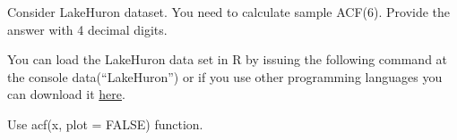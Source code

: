 
\begin{question}
Consider LakeHuron dataset. You need to calculate sample ACF(6). Provide the answer with 4 decimal digits.

You can load the LakeHuron data set in R by issuing the following command at the console data(``LakeHuron'') or if you use other programming languages you can download it \href{https://github.com/vincentarelbundock/Rdatasets/blob/master/csv/datasets/LakeHuron.csv}{here}.
\end{question}

\begin{solution}
Use acf(x, plot = FALSE) function.
\end{solution}

